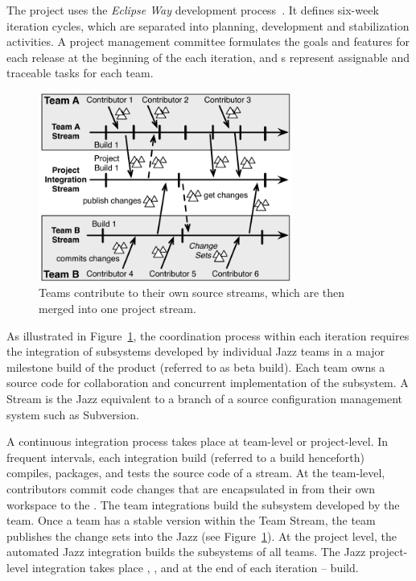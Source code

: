 The project uses the \emph{Eclipse Way} development process~\cite{frost:ieeesoftware:2007}.
It defines six-week iteration cycles, which are separated into planning,
development and stabilization activities. A project management committee
formulates the goals and features for each release at the beginning of the each
iteration, and s represent assignable and traceable tasks for each
team.

\begin{figure}[t]
\begin{center}
\includegraphics[width=8.3cm]{figures/BuildResult}
\caption{Teams contribute to their own source streams, which are then merged into one project stream.}
\label{fig:BuildResult}
\end{center}
\end{figure}


As illustrated in Figure~\ref{fig:BuildResult}, the coordination process within
each iteration requires the integration of subsystems developed by individual
Jazz teams in a major milestone build of the product (referred to as beta build).
Each team owns a source code  for collaboration and concurrent
implementation of the subsystem. A Stream is the Jazz equivalent to a branch of a
source configuration management system such as Subversion.

A continuous integration process takes place at team-level or project-level. In
frequent intervals, each integration build (referred to a build henceforth)
compiles, packages, and tests the source code of a stream. At the team-level,
contributors commit code changes that are encapsulated in  from
their own workspace to the . The team integrations build the
subsystem developed by the team. Once a team has a stable version within the Team
Stream, the team publishes the change sets into the Jazz  (see Figure~\ref{fig:BuildResult}). At the project level, the automated
Jazz integration builds the subsystems of all teams. The Jazz project-level
integration takes place , , and at the end of each
iteration --  build.

